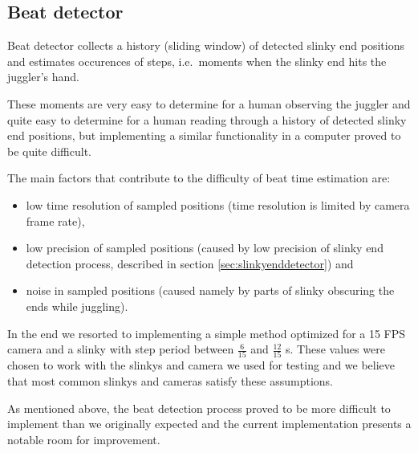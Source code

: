 

\subsection{Beat detector}

Beat detector collects a history (sliding window) of detected
slinky end positions and estimates occurences of steps,
i.e.~moments when the slinky end hits the juggler's hand.

These moments are very easy to determine for a human
observing the juggler
and quite easy to determine for a human reading through a history of
detected slinky end positions,
but implementing a similar functionality in a computer
proved to be quite difficult.

The main factors that contribute to the difficulty
of beat time estimation are:

\begin{itemize}

\item low time resolution of sampled positions
(time resolution is limited by camera frame rate),

\item low precision of sampled positions
(caused by low precision of slinky end detection process,
described in section \ref{sec:slinkyenddetector}) and

\item noise in sampled positions
(caused namely by parts of slinky obscuring the ends while juggling).

\end{itemize}

In the end we resorted to implementing a simple method
optimized for a 15 FPS camera
and a slinky with step period between
$\frac{6}{15}$ and $\frac{12}{15}$ s.
These values were chosen to work with the slinkys and camera
we used for testing
and we believe that
most common slinkys and cameras satisfy these assumptions.

As mentioned above,
the beat detection process proved to be more difficult to implement
than we originally expected
and the current implementation presents a notable room for improvement.
